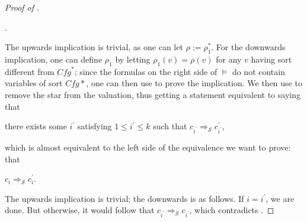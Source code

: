 \documentclass{article}
\newenvironment{proofenv}
  {
    \VerbatimEnvironment\begin{tcolorbox}[colback=black!0!white] %
  }
  {
   \end{tcolorbox}
  }
\begin{document}
\begin{proof}[Proof of ]
\begin{proofenv}
\begin{itemize}
    .
\end{itemize}
\end{proofenv}
The upwards implication is trivial, as one can let $\rho := \rho_1^*$.
For the downwards implication, one can define $\rho_1$ by letting $\rho_1(v) = \rho(v)$ for any $v$
having sort different from $\mathit{Cfg}^*$; since the formulas on the right side of $\vDash$ do not contain
variables of sort $\mathit{Cfg}*$, one can then use  to prove the implication.
We then use  to remove the star from the valuation, thus getting a statement
equivalent to saying that
\begin{proofenv}
there exists some $i^\prime$ satisfying $1 \leq i^\prime \leq k$
such that $c_{i^\prime} \Rightarrow_{\mathcal{S}} c^\prime_{i^\prime}$,
\end{proofenv}
which is almost equivalent to the left side of the equivalence we want to prove:
that
\begin{proofenv}
$c_{i} \Rightarrow_{\mathcal{S}} c^\prime_{i}$.
\end{proofenv}
The upwards implication is trivial; the downwards is as follows. If $i = i^\prime$, we are done.
But otherwise, it would follow that $c_{i^\prime} \Rightarrow_{\mathcal{S}} c_{i^\prime}$,
which contradicts .
\end{proof}
\end{document}

